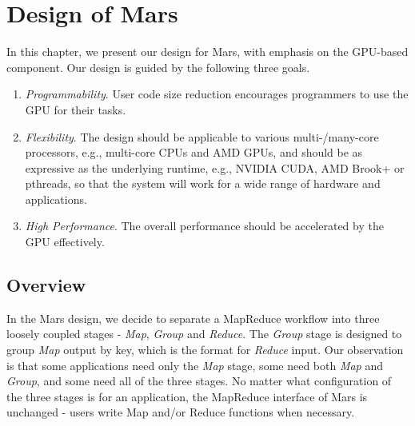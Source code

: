 \chapter{Design of Mars} \label{sec-design}

In this chapter, we present our design for Mars, with emphasis on the GPU-based component.
Our design is guided by the following three goals.

\begin{enumerate}
  \item {\em Programmability}. User code size reduction encourages programmers to use the GPU for their tasks.
  \item {\em Flexibility}. The design should be applicable to various multi-/many-core processors, e.g., multi-core CPUs and AMD GPUs, and should be as expressive as the underlying runtime, e.g., NVIDIA CUDA, AMD Brook+ or pthreads, so that the system will work for a wide range of hardware and applications.
  \item {\em High Performance}. The overall performance should be accelerated by the GPU effectively.
\end{enumerate}

\section{Overview}


In the Mars design, we decide to separate a MapReduce workflow into three loosely coupled stages -
{\em Map}, {\em Group} and {\em Reduce}. The {\em Group} stage is designed to group {\em Map} output by key, which is the format for {\em Reduce} input. Our observation is that some applications need only the
{\em Map} stage, some need both {\em Map} and {\em Group}, and some need all of the three stages.
No matter what configuration of the three stages is for an application, the MapReduce interface
of Mars is unchanged - users write Map and/or Reduce functions when necessary.

